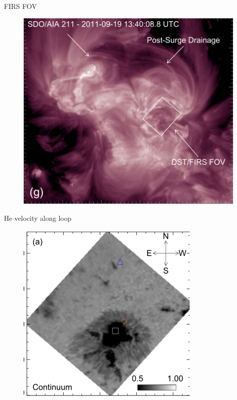 \documentclass{beamer}
\begin{document}
\begin{frame}{FIRS FOV}

 
\begin{figure}[H]
 \centering
 \includegraphics[scale=0.5]{img2.png}
\end{figure}



\end{frame}
\begin{frame}{He velocity along loop}

 
\begin{figure}[H]
 \centering
 \includegraphics[scale=0.6]{sp_cont.png}
\end{figure}



\end{frame}
\end{document}
